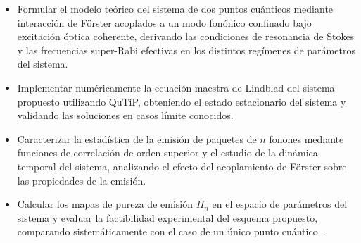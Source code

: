 \begin{itemize}
	\item Formular el modelo teórico del sistema de dos puntos cuánticos mediante interacción de Förster acoplados a un modo fonónico confinado bajo excitación óptica coherente, derivando las condiciones de resonancia de Stokes y las frecuencias super-Rabi efectivas en los distintos regímenes de parámetros del sistema.
	
	\item Implementar numéricamente la ecuación maestra de Lindblad del sistema propuesto utilizando QuTiP, obteniendo el estado estacionario del sistema y validando las soluciones en casos límite conocidos.
	
	\item Caracterizar la estadística de la emisión de paquetes de $n$ fonones mediante funciones de correlación de orden superior y el estudio de la dinámica temporal del sistema, analizando el efecto del acoplamiento de Förster sobre las propiedades de la emisión.
	
	\item Calcular los mapas de pureza de emisión $\Pi_n$ en el espacio de parámetros del sistema y evaluar la factibilidad experimental del esquema propuesto, comparando sistemáticamente con el caso de un único punto cuántico~\cite{bin2020}.
\end{itemize}